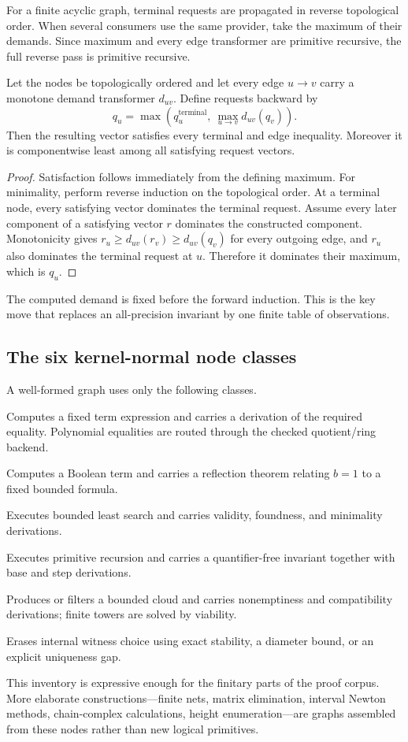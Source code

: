 For a finite acyclic graph, terminal requests are propagated in reverse topological order.  When several consumers use the same provider, take the maximum of their demands.  Since maximum and every edge transformer are primitive recursive, the full reverse pass is primitive recursive.

\begin{lemma}\label{lem:demand-least}
Let the nodes be topologically ordered and let every edge \(u\to v\) carry a monotone demand transformer \(d_{uv}\).  Define requests backward by
\[
 q_u=\max\left(q_u^{\mathrm{terminal}},\ \max_{u\to v}d_{uv}(q_v)\right).
\]
Then the resulting vector satisfies every terminal and edge inequality.  Moreover it is componentwise least among all satisfying request vectors.
\end{lemma}

\begin{proof}
Satisfaction follows immediately from the defining maximum.  For minimality, perform reverse induction on the topological order.  At a terminal node, every satisfying vector dominates the terminal request.  Assume every later component of a satisfying vector \(r\) dominates the constructed component.  Monotonicity gives
\(r_u\ge d_{uv}(r_v)\ge d_{uv}(q_v)\) for every outgoing edge, and \(r_u\) also dominates the terminal request at \(u\).  Therefore it dominates their maximum, which is \(q_u\).
\end{proof}

The computed demand is fixed before the forward induction.  This is the key move that replaces an all-precision invariant by one finite table of observations.

\subsection{The six kernel-normal node classes}

A well-formed \KIFC graph uses only the following classes.

\begin{description}[style=nextline,leftmargin=2.4em]
\item[Algebra node.] Computes a fixed term expression and carries a derivation of the required equality.  Polynomial equalities are routed through the checked quotient/ring backend.
\item[Boolean node.] Computes a Boolean term and carries a reflection theorem relating \(b=1\) to a fixed bounded formula.
\item[Search node.] Executes bounded least search and carries validity, foundness, and minimality derivations.
\item[Loop node.] Executes primitive recursion and carries a quantifier-free invariant together with base and step derivations.
\item[Relation node.] Produces or filters a bounded cloud and carries nonemptiness and compatibility derivations; finite towers are solved by viability.
\item[Observer node.] Erases internal witness choice using exact stability, a diameter bound, or an explicit uniqueness gap.
\end{description}

This inventory is expressive enough for the finitary parts of the proof corpus.  More elaborate constructions---finite nets, matrix elimination, interval Newton methods, chain-complex calculations, height enumeration---are graphs assembled from these nodes rather than new logical primitives.
